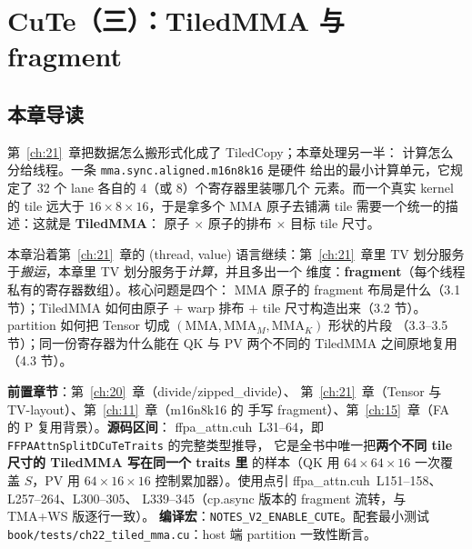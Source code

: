 \makeatletter
\providecommand{\urlchbrk}[1]{\@tfor\next:=#1\do{\next\allowbreak}}
\makeatother
\providecommand{\url}[1]{{\ttfamily\urlchbrk{#1}}}
\chapter{CuTe（三）：TiledMMA 与 fragment}\label{ch:22}

\section{本章导读}

第~\ref{ch:21}~章把数据怎么搬形式化成了 TiledCopy；本章处理另一半：
计算怎么分给线程。一条 \texttt{mma.\allowbreak{}sync.\allowbreak{}aligned.\allowbreak{}m16n8k16} 是硬件
给出的最小计算单元，它规定了 32 个 lane 各自的 4（或 8）个寄存器里装哪几个
元素。而一个真实 kernel 的 tile 远大于 $16\times8\times16$，于是拿多个
MMA 原子去铺满 tile 需要一个统一的描述：这就是 \textbf{TiledMMA}：
原子 $\times$ 原子的排布 $\times$ 目标 tile 尺寸。

本章沿着第~\ref{ch:21}~章的 (thread, value) 语言继续：第~\ref{ch:21}~章里
TV 划分服务于\emph{搬运}，本章里 TV 划分服务于\emph{计算}，并且多出一个
维度：\textbf{fragment}（每个线程私有的寄存器数组）。核心问题是四个：
MMA 原子的 fragment 布局是什么（3.1 节）；TiledMMA 如何由原子 $+$ warp
排布 $+$ tile 尺寸构造出来（3.2 节）。partition 如何把 Tensor 切成
$(\mathrm{MMA}, \mathrm{MMA}_M, \mathrm{MMA}_K)$ 形状的片段
（3.3--3.5 节）；同一份寄存器为什么能在 QK 与 PV 两个不同的
TiledMMA 之间原地复用（4.3 节）。

\textbf{前置章节}：第~\ref{ch:20}~章（divide/zipped\_divide）、
第~\ref{ch:21}~章（Tensor 与 TV-layout）、第~\ref{ch:11}~章（m16n8k16 的
手写 fragment）、第~\ref{ch:15}~章（FA 的 P 复用背景）。\textbf{源码区间}：
ffpa\_attn.cuh~L31--64，即 \texttt{FFPAAttn\allowbreak{}Split\allowbreak{}DCu\allowbreak{}Te\allowbreak{}Traits} 的完整类型推导，
它是全书中唯一把\textbf{两个不同 tile 尺寸的 TiledMMA 写在同一个 traits 里}
的样本（QK 用 $64\times64\times16$ 一次覆盖 $S$，PV 用 $64\times16\times16$
控制累加器）。使用点引 ffpa\_attn.cuh~L151--158、L257--264、L300--305、
L339--345（cp.async 版本的 fragment 流转，与 TMA+WS 版逐行一致）。
\textbf{编译宏}：\texttt{NOTES\_\allowbreak{}V2\_\allowbreak{}ENABLE\_\allowbreak{}CUTE}。配套最小测试
\texttt{book/\allowbreak{}tests/\allowbreak{}ch22\_\allowbreak{}tiled\_\allowbreak{}mma.cu}：host 端 partition 一致性断言。

